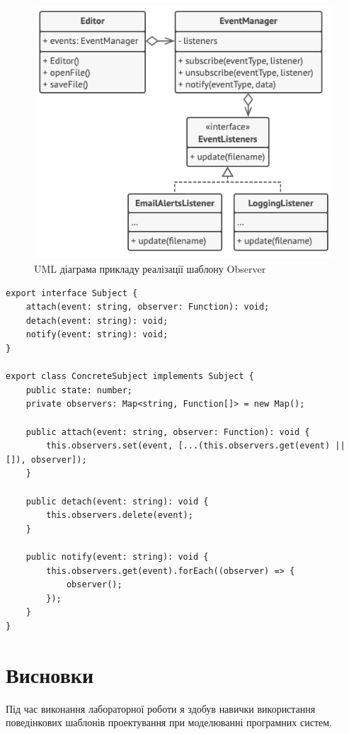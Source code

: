 \documentclass[oneside,14pt]{extarticle}
\begin{document}
\begin{normalsize}
		\begin{figure}[H]
		\centering
		\includegraphics{observer-ex}
		\caption{UML діаграма прикладу реалізації шаблону Observer}
	\end{figure}
	
	\begin{small}
		\begin{lstlisting}
export interface Subject {
	attach(event: string, observer: Function): void;
	detach(event: string): void;
	notify(event: string): void;
}

export class ConcreteSubject implements Subject {
	public state: number;
	private observers: Map<string, Function[]> = new Map();
	
	public attach(event: string, observer: Function): void {
		this.observers.set(event, [...(this.observers.get(event) || []), observer]);
	}
	
	public detach(event: string): void {
		this.observers.delete(event);
	}
	
	public notify(event: string): void {
		this.observers.get(event).forEach((observer) => {
			observer();
		});
	}
}
		\end{lstlisting}
	\end{small}
	
	\section*{Висновки}
	   Під час виконання лабораторної роботи я здобув навички використання поведінкових шаблонів проектування при моделюванні програмних систем.
\end{normalsize}
\end{document}
